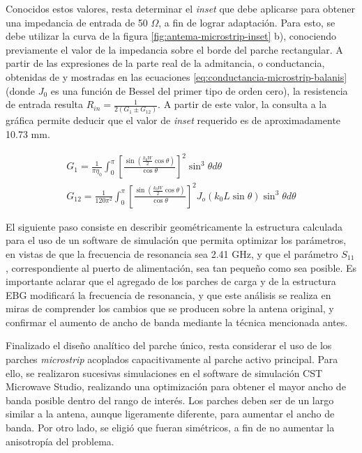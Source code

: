 Conocidos estos valores, resta determinar el \textit{inset} que debe aplicarse para obtener una impedancia de entrada de 50 $\Omega$, a fin de lograr adaptación. Para esto, se debe utilizar la curva de la figura \ref{fig:antema-microstrip-inset} b), conociendo previamente el valor de la impedancia sobre el borde del parche rectangular. A partir de las expresiones de la parte real de la admitancia, o conductancia, obtenidas de \cite{Balanis:Theory} y mostradas en las ecuaciones \ref{eq:conductancia-microstrip-balanis} (donde $J_0$ es una función de Bessel del primer tipo de orden cero), la resistencia de entrada resulta $R_{in} = \frac{1}{2(G_1 \pm G_{12})}$. A partir de este valor, la consulta a la gráfica permite deducir que el valor de \textit{inset} requerido es de aproximadamente 10.73 mm.

\begin{align}
	\label{eq:conductancia-microstrip-balanis}
	G_1 = \frac{1}{\pi \eta_0} \int_0^\pi \left[ \frac{\sin \left( \frac{k_0 W}{2} \cos \theta \right) }{\cos \theta}\right]^2 \sin^3 \theta d\theta \\
	G_{12} = \frac{1}{120 \pi^2} \int_0^{\pi} \left[ \frac{\sin \left( \frac{k_0 W}{2} \cos \theta \right) }{\cos \theta}\right]^2 J_o(k_0 L \sin \theta) \sin^3 \theta d\theta
\end{align}

El siguiente paso consiste en describir geométricamente la estructura calculada para el uso de un software de simulación que permita optimizar los parámetros, en vistas de que la frecuencia de resonancia sea 2.41 GHz, y que el parámetro $S_{11}$, correspondiente al puerto de alimentación, sea tan pequeño como sea posible. Es importante aclarar que el agregado de los parches de carga y de la estructura EBG modificará la frecuencia de resonancia, y que este análisis se realiza en miras de comprender los cambios que se producen sobre la antena original, y confirmar el aumento de ancho de banda mediante la técnica mencionada antes.


Finalizado el diseño analítico del parche único, resta considerar el uso de los parches \textit{microstrip} acoplados capacitivamente al parche activo principal. Para ello, se realizaron sucesivas simulaciones en el software de simulación CST Microwave Studio, realizando una optimización para obtener el mayor ancho de banda posible dentro del rango de interés. Los parches deben ser de un largo similar a la antena, aunque ligeramente diferente, para aumentar el ancho de banda. Por otro lado, se eligió que fueran simétricos, a fin de no aumentar la anisotropía del problema.

